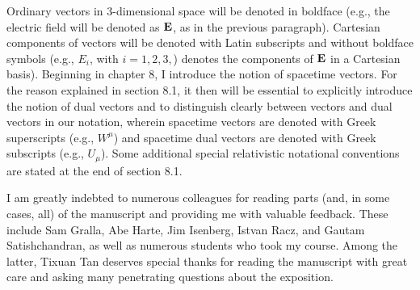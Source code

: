 Ordinary vectors in 3-dimensional space will be denoted in boldface (e.g., the electric field will be denoted as $\vb{E}$, as in the previous paragraph). Cartesian components of vectors will be denoted with Latin subscripts and without boldface symbols (e.g., $E_i$, with $i=1,2,3,$) denotes the components of $\vb{E}$ in a Cartesian basis). Beginning in chapter 8, I introduce the notion of spacetime vectors. For the reason explained in section 8.1, it then will be essential to explicitly introduce the notion of dual vectors and to distinguish clearly between vectors and dual vectors in our notation, wherein spacetime vectors are denoted with Greek superscripts (e.g., $W^\mu$) and spacetime dual vectors are denoted with Greek subscripts (e.g., $U_\mu$). Some additional special relativistic notational conventions are stated at the end of section 8.1.

I am greatly indebted to numerous colleagues for reading parts (and, in some cases, all) of the manuscript and providing me with valuable feedback. These include Sam Gralla, Abe Harte, Jim Isenberg, Istvan Racz, and Gautam Satishchandran, as well as numerous students who took my course. Among the latter, Tixuan Tan deserves special thanks for reading the manuscript with great care and asking many penetrating questions about the exposition. 